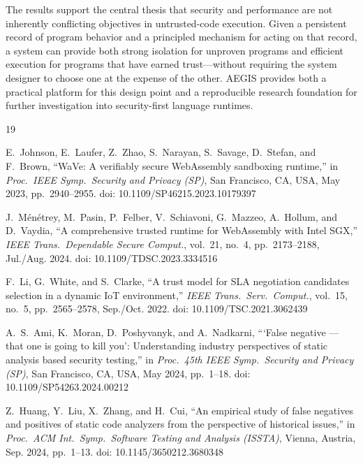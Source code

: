 \documentclass[conference]{IEEEtran}
\begin{document}
The results support the central thesis that security and performance
are not inherently conflicting objectives in untrusted-code execution.
Given a persistent record of program behavior and a principled
mechanism for acting on that record, a system can provide both
strong isolation for unproven programs and efficient execution for
programs that have earned trust—without requiring the system
designer to choose one at the expense of the other. AEGIS provides
both a practical platform for this design point and a reproducible
research foundation for further investigation into security-first
language runtimes.

\balance
\begin{thebibliography}{19}

E.~Johnson, E.~Laufer, Z.~Zhao, S.~Narayan, S.~Savage, D.~Stefan,
and F.~Brown,
``WaVe: A verifiably secure {WebAssembly} sandboxing runtime,''
in \emph{Proc.\ IEEE Symp.\ Security and Privacy (SP)},
San Francisco, CA, USA, May 2023, pp.~2940--2955.
doi: 10.1109/SP46215.2023.10179397

J.~M\'en\'etrey, M.~Pasin, P.~Felber, V.~Schiavoni, G.~Mazzeo,
A.~Hollum, and D.~Vaydia,
``A comprehensive trusted runtime for {WebAssembly} with {Intel SGX},''
\emph{IEEE Trans.\ Dependable Secure Comput.}, vol.~21, no.~4,
pp.~2173--2188, Jul./Aug. 2024.
doi: 10.1109/TDSC.2023.3334516

F.~Li, G.~White, and S.~Clarke,
``A trust model for {SLA} negotiation candidates selection in a
dynamic {IoT} environment,''
\emph{IEEE Trans.\ Serv.\ Comput.}, vol.~15, no.~5,
pp.~2565--2578, Sep./Oct. 2022.
doi: 10.1109/TSC.2021.3062439

A.~S.~Ami, K.~Moran, D.~Poshyvanyk, and A.~Nadkarni,
```False negative --- that one is going to kill you':
Understanding industry perspectives of static analysis based
security testing,''
in \emph{Proc.\ 45th IEEE Symp.\ Security and Privacy (SP)},
San Francisco, CA, USA, May 2024, pp.~1--18.
doi: 10.1109/SP54263.2024.00212

Z.~Huang, Y.~Liu, X.~Zhang, and H.~Cui,
``An empirical study of false negatives and positives of static
code analyzers from the perspective of historical issues,''
in \emph{Proc.\ ACM Int.\ Symp.\ Software Testing and Analysis
(ISSTA)}, Vienna, Austria, Sep. 2024, pp.~1--13.
doi: 10.1145/3650212.3680348


\end{thebibliography}
\end{document}
